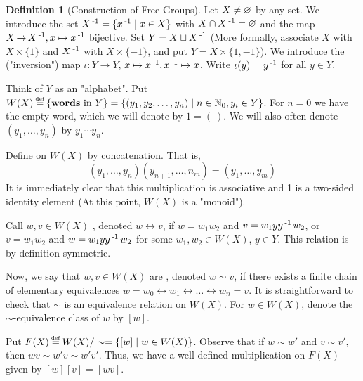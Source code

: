 \documentclass[11pt]{book}
\theoremstyle{definition}   \newtheorem{defn}[counter]{Definition} %
\newcommand{\lra}{\leftrightarrow}   \newcommand{\0}{\mathbf{0}}   \newcommand{\mc}[1]{\mathcal{#1}}   \newcommand{\hra}{\hookrightarrow}   \newcommand{\hla}{\hookleftarrow}
\newcommand\myeq{\mathrel{\overset{\makebox[0pt]{\mbox{\normalfont\tiny\sffamily \textrm{def}}}}{=}}}
\DeclareMathOperator{\ra}{\rightarrow}   \DeclareMathOperator{\Poly}{\mathbf{P}}   \DeclareMathOperator{\spn}{\textnormal{span}}   \DeclareMathOperator{\aut}{\textnormal{Aut}}
\numberwithin{counter}{chapter}
\begin{document}
\begin{defn}[Construction of Free Groups]
Let $X \ne \varnothing$ by any set. We introduce the set $X \operatorname{^{-1}} = \{x\operatorname{^{-1}} \mid x \in X\}$ with $X \cap X\operatorname{^{-1}} = \varnothing$ and the map $X \ra X\inv, x \mapsto x\inv$ bijective. Set $Y = X \sqcup X\operatorname{^{-1}}$ (More formally, associate $X$ with $X \times \{1\}$ and $X\operatorname{^{-1}}$ with $X \times \{-1\}$, and put $Y = X \times \{1,-1\}$). We introduce the ("inversion") map $\iota : Y \ra Y$, $x \mapsto x\operatorname{^{-1}}, x\operatorname{^{-1}} \mapsto x$. Write $\iota (y) = y\operatorname{^{-1}}$ for all $y \in Y$.

Think of $Y$ as an "alphabet". Put $W(X) \myeq \{\tn{\tb{words} in } Y\} = \{(y_1,y_2,\dots,y_n) \mid n \in \N_0, y_i \in Y\}$. For $n=0$ we have the empty word, which we will denote by $1 = (\ )$. We will also often denote $(y_1,\dots,y_n)$ by $y_1 \cdots y_n$.

Define  on $W(X)$ by concatenation. That is,
	\[(y_1,\dots,y_n)(y_{n+1},\dots,n_m) = (y_1,\dots,y_m) \]
It is immediately clear that this multiplication is associative and 1 is a two-sided identity element (At this point, $W(X)$ is a "monoid").

Call $w,v \in W(X)$ , denoted $w \lra v$, if $w =w_1 w_2$ and $v = w_1 y y\operatorname{^{-1}} w_2$, or $v = w_1 w_2$ and $w = w_1 y y\operatorname{^{-1}} w_2$ for some $w_1,w_2 \in W(X)$, $y \in Y$. This relation is by definition symmetric.

Now, we say that $w,v \in W(X)$ are , denoted $w \sim v$, if there exists a finite chain of elementary equivalences $w = w_0 \lra w_1 \lra \dots \lra w_n = v$. It is straightforward to check that $\sim$ is an equivalence relation on $W(X)$. For $w \in W(X)$, denote the $\sim$-equivalence class of $w$ by $[w]$.

Put $F(X) \myeq W(X)/\sim = \{[w] \mid w \in W(X)\}$. Observe that if $w \sim w'$ and $v \sim v'$, then $wv \sim w'v \sim w'v'$. Thus, we have a well-defined multiplication on $F(X)$ given by $[w][v] = [wv]$.


\end{defn}
\end{document}
